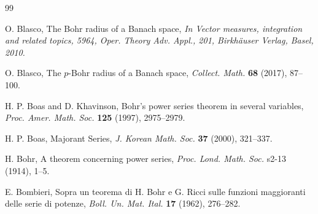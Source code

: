 \documentclass[a4paper,12pt]{amsart}
\theoremstyle{definition}
\begin{document}
\begin{thebibliography}{99}
	
	
	
	
	
	
	 {\sc O. Blasco}, The Bohr radius of a Banach space, {\it In Vector measures, integration and related topics, 5964, Oper. Theory Adv. Appl., 201, Birkh{\"a}user Verlag, Basel, 2010.}
	
	 {\sc O. Blasco}, The $p$-Bohr radius of a Banach space, {\it Collect. Math.} {\bf 68} (2017), 87--100.
	
	
	 {\sc H. P. Boas} and {\sc D. Khavinson}, Bohr's power series theorem in several variables, {\it Proc. Amer. Math. Soc.}  {\bf 125} (1997), 2975--2979.
	
		 {\sc H. P. Boas}, Majorant Series,  {\it J. Korean Math. Soc.}  {\bf 37} (2000), 321--337.
	
	 {\sc H. Bohr}, A theorem concerning power series,  {\it Proc. Lond. Math. Soc.} s2-13 (1914), 1--5.
	
	 {\sc E. Bombieri}, Sopra un teorema di H. Bohr e G. Ricci sulle funzioni maggioranti delle serie di potenze, {\it Boll. Un. Mat. Ital.} {\bf 17} (1962), 276--282.
	

\end{thebibliography}
\end{document}
